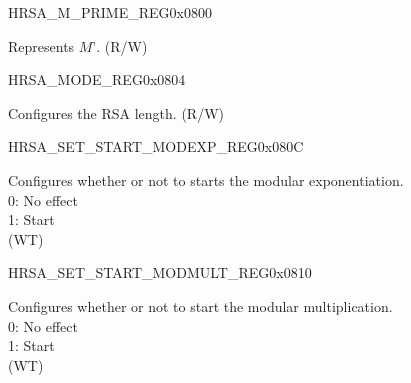 \begin{register}{H}{RSA\_M\_PRIME\_REG}{0x0800}\label{regdesc:RSAMPRIMEREG}
%
\regnewline%
\begin{regdesc}\begin{reglist}
\label{fielddesc:RSAMPRIME}\item [RSA\_M\_PRIME] Represents $M’$. (R/W)
\end{reglist}\end{regdesc}
\end{register}


\begin{register}{H}{RSA\_MODE\_REG}{0x0804}\label{regdesc:RSAMODEREG}
%
%
\regnewline%
\begin{regdesc}\begin{reglist}
\label{fielddesc:RSAMODE}\item [RSA\_MODE] Configures the RSA length. (R/W)
\end{reglist}\end{regdesc}
\end{register}


\begin{register}{H}{RSA\_SET\_START\_MODEXP\_REG}{0x080C}\label{regdesc:RSASETSTARTMODEXPREG}
%
%
\regnewline%
\begin{regdesc}\begin{reglist}
\label{fielddesc:RSASETSTARTMODEXP}\item [RSA\_SET\_START\_MODEXP] Configures whether or not to starts the modular exponentiation. \\
0: No effect\\
1: Start\\
 (WT)
\end{reglist}\end{regdesc}
\end{register}


\begin{register}{H}{RSA\_SET\_START\_MODMULT\_REG}{0x0810}\label{regdesc:RSASETSTARTMODMULTREG}
%
%
\regnewline%
\begin{regdesc}\begin{reglist}
\label{fielddesc:RSASETSTARTMODMULT}\item [RSA\_SET\_START\_MODMULT] Configures whether or not to start the modular multiplication.\\
0: No effect\\
1: Start\\
 (WT)
\end{reglist}\end{regdesc}
\end{register}


